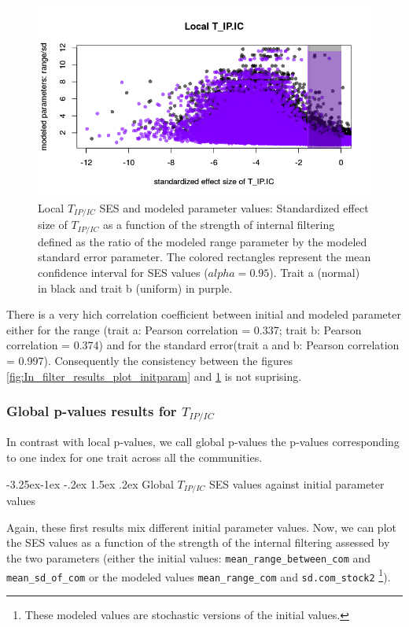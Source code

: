 \documentclass[12pt]{article}\usepackage[]{graphicx}\usepackage[]{color}
\makeatletter
\def\maxwidth{ %
  \ifdim\Gin@nat@width>\linewidth
    \linewidth
  \else
    \Gin@nat@width
  \fi
}
\newenvironment{knitrout}{}{} %
\newcounter {subsubsubsection}[subsubsection]
\newcommand\subsubsubsection{\@startsection{subsubsubsection}{4}{\z@}%
          {-3.25ex\@plus -1ex \@minus -.2ex}%
          {1.5ex \@plus .2ex}%
          {\normalfont\normalsize\bfseries}}
\makeatother
\begin{document}
\begin{knitrout}
\begin{figure}
{\centering \includegraphics[width=\maxwidth]{figure/In_filter_results_plot_modeledparam-1} 

}

\caption[Local $T_{IP/IC}$ SES and modeled parameter values]{Local $T_{IP/IC}$ SES and modeled parameter values: Standardized effect size of $T_{IP/IC}$ as a  function of the strength of internal filtering defined as the ratio of the modeled range parameter by the modeled standard error parameter. The colored rectangles represent the mean confidence interval for SES values ($alpha = 0.95$). Trait a (normal) in black and trait b (uniform) in purple.}\label{fig:In_filter_results_plot_modeledparam}
\end{figure}


\end{knitrout}

There is a very hich correlation coefficient between initial and modeled parameter either for the range (trait a: Pearson correlation = 0.337; trait b: Pearson correlation = 0.374) and for the standard error(trait a and b: Pearson correlation = 0.997). Consequently the consistency between the figures \ref{fig:In_filter_results_plot_initparam} and  \ref{fig:In_filter_results_plot_modeledparam} is not suprising. 
 
 \subsubsection {Global p-values results for $T_{IP/IC}$}
In contrast with local p-values, we call global p-values the p-values corresponding to one index for one trait across all the communities. 

  \subsubsubsection {Global $T_{IP/IC}$ SES values against initial parameter values}
  
Again, these first results mix different initial parameter values. Now, we can plot the SES values as a function of the strength of the internal filtering assessed by the two parameters (either the initial values: \texttt{mean\_{}range\_{}between\_{}com} and \texttt{mean\_{}sd\_{}of\_{}com} or the modeled values \texttt{mean\_{}range\_{}com} and \texttt{sd.com\_{}stock2} \footnote{These modeled values are stochastic versions of the initial values.}). 
\end{document}
